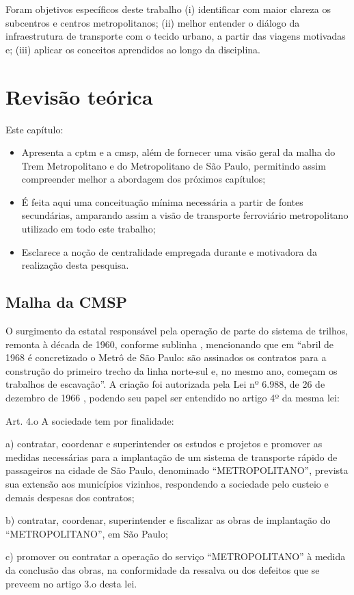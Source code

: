 	Foram objetivos específicos deste trabalho (i) identificar com maior clareza os subcentros e centros metropolitanos; (ii) melhor entender o diálogo da infraestrutura de transporte com o tecido urbano, a partir das viagens motivadas e; (iii) aplicar os conceitos aprendidos ao longo da disciplina.
	
%
%
	\chapter{Revisão teórica}
	
	Este capítulo:
	\begin{itemize}
		\item Apresenta a \gls{cptm} e a \gls{cmsp}, além de fornecer uma visão geral da malha do Trem Metropolitano e do Metropolitano de São Paulo, permitindo assim compreender melhor a abordagem dos próximos capítulos;
		\item É feita aqui uma conceituação mínima necessária a partir de fontes secundárias, amparando assim a visão de transporte ferroviário metropolitano utilizado em todo este trabalho;
		\item Esclarece a noção de centralidade empregada durante e motivadora da realização desta pesquisa.
	\end{itemize}
	
	\section{Malha da CMSP}
	
	O surgimento da estatal responsável pela operação de parte do sistema de trilhos, remonta à década de 1960, conforme sublinha , mencionando que em ``abril de 1968 é concretizado o Metrô de São Paulo: são assinados os contratos para a construção do primeiro trecho da linha norte-sul e, no mesmo ano, começam os trabalhos de escavação''. A criação foi autorizada pela Lei nº 6.988, de 26 de dezembro de 1966 \cite{lei6988}, podendo seu papel ser entendido no artigo 4º da mesma lei:
	
	\begin{citacao}
		Art. 4.o \textemdash A sociedade tem por finalidade:
		
		a) contratar, coordenar e superintender os estudos e projetos e promover as medidas necessárias para a implantação de um sistema de transporte rápido de passageiros na cidade de São Paulo, denominado ``METROPOLITANO'', prevista sua extensão aos municípios vizinhos, respondendo a sociedade pelo custeio e demais despesas dos contratos;
		
		b) contratar, coordenar, superintender e fiscalizar as obras de implantação do ``METROPOLITANO'', em São Paulo;
		
		c) promover ou contratar a operação do serviço ``METROPOLITANO'' \textemdash à medida da conclusão das obras, na conformidade da ressalva ou dos defeitos que se preveem no artigo 3.o desta lei.
	\end{citacao}
	
